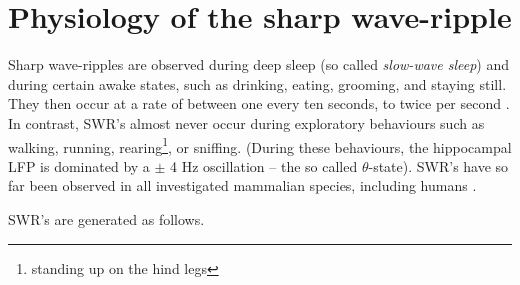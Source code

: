 \section{Physiology of the sharp wave-ripple}
\label{sec:physiology}

Sharp wave-ripples are observed during deep sleep (so called \emph{slow-wave sleep}) and during certain awake states, such as drinking, eating, grooming, and staying still. They then occur at a rate of between one every ten seconds, to twice per second \cite{Girardeau2011}. In contrast, SWR's almost never occur during exploratory behaviours such as walking, running, rearing\footnote{standing up on the hind legs}, or sniffing. (During these behaviours, the hippocampal LFP is dominated by a $\pm$ 4 Hz oscillation -- the so called $\theta$-state). SWR's have so far been observed in all investigated mammalian species, including humans \cite{Buzsaki2015}.

SWR's are generated as follows. 
